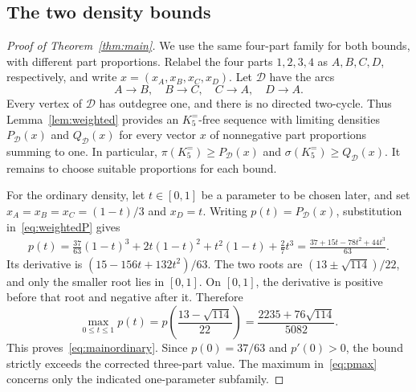 \documentclass[11pt]{article}
\theoremstyle{remark}
\numberwithin{equation}{section}
\newcommand{\F}{K_5^{=}}
\begin{document}
\subsection{The two density bounds}

\begin{proof}[Proof of Theorem~\ref{thm:main}]
We use the same four-part family for both bounds, with different part
proportions. Relabel the four parts $1,2,3,4$ as $A,B,C,D$,
respectively, and write $x=(x_A,x_B,x_C,x_D)$. Let $\mathcal D$ have
the arcs
\begin{equation*}
 A\to B,\quad B\to C,\quad C\to A,\quad D\to A.
\end{equation*}
Every vertex of $\mathcal D$ has outdegree one, and there is no directed
two-cycle. Thus Lemma~\ref{lem:weighted} provides an $\F$-free sequence
with limiting densities $P_{\mathcal D}(x)$ and $Q_{\mathcal D}(x)$ for
every vector $x$ of nonnegative part proportions summing to one.
In particular, $\pi(\F)\ge P_{\mathcal D}(x)$ and
$\sigma(\F)\ge Q_{\mathcal D}(x)$. It remains to choose suitable
proportions for each bound.

For the ordinary density, let $t\in[0,1]$ be a parameter to be chosen
later, and set $x_A=x_B=x_C=(1-t)/3$ and $x_D=t$.
Writing $p(t)=P_{\mathcal D}(x)$, substitution
in~\eqref{eq:weightedP} gives
\begin{equation*}
\begin{split}
 p(t)=\frac{37}{63}(1-t)^3+2t(1-t)^2+t^2(1-t)+\frac27t^3
     =\frac{37+15t-78t^2+44t^3}{63}.
\end{split}
\end{equation*}
Its derivative is $(15-156t+132t^2)/63$. The two roots are
$(13\pm\sqrt{114})/22$, and only the smaller root lies in $[0,1]$.
On $[0,1]$, the derivative is positive before that root and negative
after it.
Therefore
\begin{equation}\label{eq:pmax}
 \max_{0\le t\le1}p(t)
 =p\left(\frac{13-\sqrt{114}}{22}\right)
 =\frac{2235+76\sqrt{114}}{5082}.
\end{equation}
This proves~\eqref{eq:mainordinary}. Since $p(0)=37/63$ and $p'(0)>0$,
the bound strictly exceeds the corrected three-part value. The maximum
in~\eqref{eq:pmax} concerns only the indicated one-parameter subfamily.


\end{proof}
\end{document}
